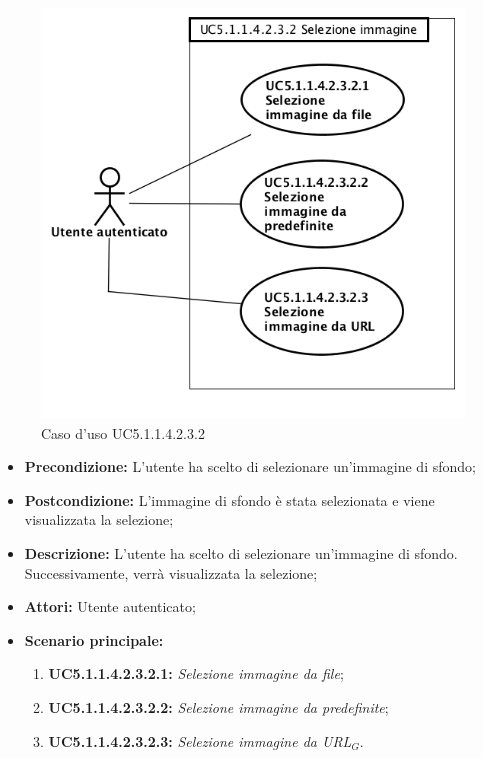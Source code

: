 \begin{figure}[h]
	\begin{center}
	\includegraphics[scale=0.4]{diagram/UC5-1-1-4-2-3-2.png}
	\caption{Caso d'uso UC5.1.1.4.2.3.2}
	\end{center}
\end{figure}
\begin{itemize}
	\item \textbf{Precondizione:} L'utente ha scelto di selezionare un'immagine di sfondo;
	\item \textbf{Postcondizione:} L'immagine di sfondo è stata selezionata e viene visualizzata la selezione;
	\item \textbf{Descrizione:} L'utente ha scelto di selezionare un'immagine di sfondo. Successivamente, verrà visualizzata la selezione;
	\item \textbf{Attori:} Utente autenticato;
	\item \textbf{Scenario principale:}
	\begin{enumerate}
		\item \textbf{ UC5.1.1.4.2.3.2.1:} \textit{ Selezione immagine da file};
		\item \textbf{ UC5.1.1.4.2.3.2.2:} \textit{ Selezione immagine da predefinite};
		\item \textbf{ UC5.1.1.4.2.3.2.3:} \textit{ Selezione immagine da URL$_G$}.
	\end{enumerate}
\end{itemize}
